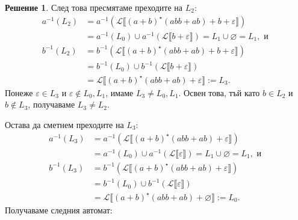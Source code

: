 \documentclass[12pt]{article}
\newcommand{\calL}{\mathcal{L}}
\newcommand{\db}[1]{\llbracket #1 \rrbracket}
\theoremstyle{definition}
\newtheorem*{solution}{Решение}
\begin{document}
\begin{solution}
След това пресмятаме преходите на $L_2$:
\begin{align*}
  a^{-1}(L_2) & = a^{-1}(\calL \db{(a + b)^\star (abb + ab) + b + \varepsilon}) \\ 
              & = a^{-1}(L_0) \cup a^{-1}(\calL \db{b + \varepsilon}) = L_1 \cup \varnothing = L_1, \text{ и } \\
  b^{-1}(L_2) & = b^{-1}(\calL \db{(a + b)^\star (abb + ab) + b + \varepsilon}) \\ 
              & = b^{-1}(L_0) \cup b^{-1}(\calL \db{b + \varepsilon}) \\ 
              & = \calL \db{(a + b)^\star (abb + ab) + \varepsilon} := L_3.
\end{align*}
Понеже $\varepsilon \in L_3$ и $\varepsilon \not\in L_0, L_1$, имаме $L_3 \neq L_0, L_1$.
Освен това, тъй като $b \in L_2$ и $b \not\in L_3$, получаваме $L_3 \neq L_2$.

Остава да сметнем преходите на $L_3$:
\begin{align*}
  a^{-1}(L_3) & = a^{-1}(\calL \db{(a + b)^\star (abb + ab) + \varepsilon}) \\ 
              & = a^{-1}(L_0) \cup a^{-1}(\calL \db{\varepsilon}) = L_1 \cup \varnothing = L_1, \text{ и } \\
  b^{-1}(L_3) & = b^{-1}(\calL \db{(a + b)^\star (abb + ab) + \varepsilon}) \\ 
              & = b^{-1}(L_0) \cup b^{-1}(\calL \db{\varepsilon}) \\ 
              & = \calL \db{(a + b)^\star (abb + ab) + \varnothing} := L_0.
\end{align*}
Получаваме следния автомат:
\begin{center}
\end{center}
\end{solution}
\end{document}
